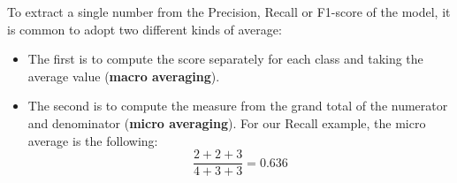 To extract a single number from the Precision, Recall or F1-score of the model, it is common to adopt two different kinds of average:
\begin{itemize}
    \item The first is to compute the score separately for each class and taking the average value (\textbf{macro averaging}).

    \item The second is to compute the measure from the grand total of the numerator and denominator (\textbf{micro averaging}). For our Recall example, the micro average is the following:
    \[\frac{2 + 2 + 3}{4 + 3 + 3 } = 0.636\]
\end{itemize}

